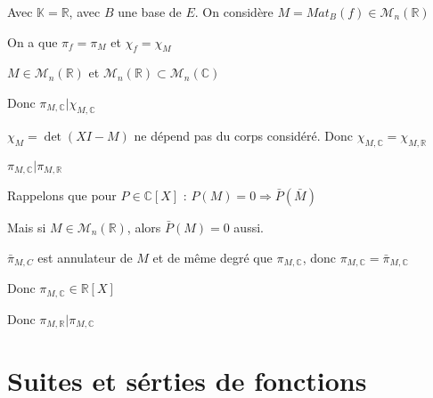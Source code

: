 \documentclass[a4paper,12pt]{book}
\def\R{\mathbb{R}}
\def\C{\mathbb{C}}
\def\K{\mathbb{K}}
\begin{document}
{\par Avec $\K=\R$, avec $B$ une base de $E$. On considère $M=Mat_B(f)\in\mathcal{M}_n(\R)$ \par On a que $\pi_f=\pi_M$ et $\chi_f=\chi_M$ \par $M\in\mathcal{M}_n(\R)$ et $\mathcal{M}_n(\R)\subset \mathcal{M}_n(\C)$ \par Donc $\pi_{M,\C}\vert \chi_{M,\C}$ \par $\chi_M = \det(XI-M)$ ne dépend pas du corps considéré. Donc $\chi_{M,\C}=\chi_{M,\R}$ \par $\pi_{M,\C}\vert\pi_{M,\R}$ \par Rappelons que pour $P\in \C[X]$ : $P(M)=0\Rightarrow \bar{P}(\bar{M})$ \par Mais si $M\in\mathcal{M}_n(\R)$, alors $\bar{P}(M)=0$ aussi. \par $\bar{\pi}_{M,C}$ est annulateur de $M$ et de même degré que $\pi_{M,\C}$, donc $\pi_{M,\C}=\bar{\pi}_{M,\C}$ \par Donc $\pi_{M,\C}\in\R[X]$ \par Donc $\pi_{M,\R}\vert\pi_{M,\C}$
}

\chapter{Suites et sérties de fonctions}
\end{document}

